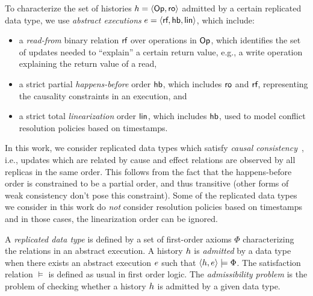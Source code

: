 To characterize the set of histories ${h}={\left\langle{\mathsf{Op}, \mathsf{ro}}\right\rangle}$ admitted by a certain replicated data type, we use \emph{abstract executions} ${e} = {\left\langle{ \textsf{rf} ,\textsf{hb},\mathsf{lin}}\right\rangle}$, which include:
\vspace{-2.5mm}
\begin{itemize}
  \item a \emph{read-from} binary relation $\textsf{rf}$ over operations in $\mathsf{Op}$, which identifies the set of updates needed to ``explain'' a certain return value, e.g., a {\sf write} operation explaining the return value of a {\sf read},
  \item a strict partial \emph{happens-before} order $\textsf{hb}$, which includes $\mathsf{ro}$ and $\textsf{rf}$, representing the causality constraints in an execution, and
  \item a strict total \emph{linearization} order $\mathsf{lin}$, which includes $\textsf{hb}$, used to model conflict resolution policies based on timestamps.
\end{itemize}
\vspace{-1mm}
In this work, we consider replicated data types which satisfy \emph{causal consistency}~\cite{DBLP:journals/cacm/Lamport78}, i.e., updates which are related by cause and effect relations are observed by all replicas in the same order. This follows from the fact that the happens-before order is constrained to be a partial order, and thus transitive (other forms of weak consistency don't pose this constraint). Some of the replicated data types we consider in this work do \emph{not} consider resolution policies based on timestamps and in those cases, the linearization order can be ignored.

A \emph{replicated data type} is defined by a set of first-order axioms $\Phi$ characterizing the relations in an abstract execution. 
A history ${h}$ is \emph{admitted} by a data type when there exists an abstract execution ${e}$ such that ${\left\langle{{h},{e}}\right\rangle}\models\Phi$. The satisfaction relation $\models$ is defined as usual in first order logic. The \emph{admissibility problem} is the problem of checking whether a history ${h}$ is admitted by a given data type.

